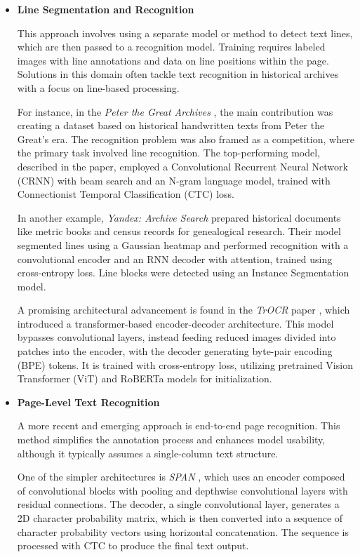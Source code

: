 \documentclass[12pt]{article}
\begin{document}
\begin{itemize}
    \item \textbf{Line Segmentation and Recognition}

    This approach involves using a separate model or method to detect text lines, which are then passed to a recognition model. Training requires labeled images with line annotations and data on line positions within the page. Solutions in this domain often tackle text recognition in historical archives with a focus on line-based processing.

    For instance, in the \textit{Peter the Great Archives} \cite{peter_dataset}, the main contribution was creating a dataset based on historical handwritten texts from Peter the Great’s era. The recognition problem was also framed as a competition, where the primary task involved line recognition. The top-performing model, described in the paper, employed a Convolutional Recurrent Neural Network (CRNN) with beam search and an N-gram language model, trained with Connectionist Temporal Classification (CTC) loss.

    In another example, \textit{Yandex: Archive Search} prepared historical documents like metric books and census records for genealogical research. Their model segmented lines using a Gaussian heatmap and performed recognition with a convolutional encoder and an RNN decoder with attention, trained using cross-entropy loss. Line blocks were detected using an Instance Segmentation model.

    A promising architectural advancement is found in the \textit{TrOCR} paper \cite{TrOCR}, which introduced a transformer-based encoder-decoder architecture. This model bypasses convolutional layers, instead feeding reduced images divided into patches into the encoder, with the decoder generating byte-pair encoding (BPE) tokens. It is trained with cross-entropy loss, utilizing pretrained Vision Transformer (ViT) and RoBERTa models for initialization.

    \item \textbf{Page-Level Text Recognition}

    A more recent and emerging approach is end-to-end page recognition. This method simplifies the annotation process and enhances model usability, although it typically assumes a single-column text structure.

    One of the simpler architectures is \textit{SPAN} \cite{SPAN}, which uses an encoder composed of convolutional blocks with pooling and depthwise convolutional layers with residual connections. The decoder, a single convolutional layer, generates a 2D character probability matrix, which is then converted into a sequence of character probability vectors using horizontal concatenation. The sequence is processed with CTC to produce the final text output.


\end{itemize}
\end{document}
